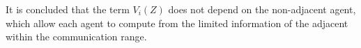 \documentclass[journal]{IEEEtran}
\newcommand{\twopartdef}[4]
{
	\left\{
	\begin{array}{ll}
		#1 & #2 \\
		#3 & #4
	\end{array}
	\right.
}
\newcommand{\threepartdef}[6]
{
	\left\{
	\begin{array}{ll}
		#1 & #2 \\
		#3 & #4 \\
		#5 & #6 
	\end{array}
	\right.
}
\begin{document}
	It is concluded that the term $V_i(Z)$ does not depend on the non-adjacent agent, which allow each agent to compute from the limited information of the adjacent within the communication range.
	
	
	
\end{document}
